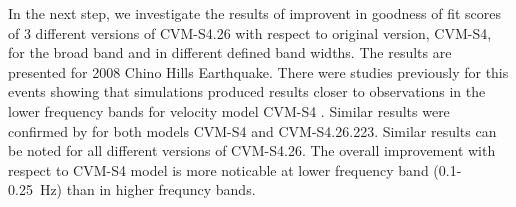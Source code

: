 

In the next step, we investigate the results of improvent in goodness of fit scores of 3 different versions of CVM-S4.26 with respect to original version, CVM-S4, for the broad band and in different defined band widths. The results are presented for 2008 Chino Hills Earthquake. There were studies previously for this events showing that simulations produced results closer to observations in the lower frequency bands for velocity model CVM-S4 \citep{Taborda_2013_BSSA}. Similar results were confirmed by \citet{Taborda_2016}for both models CVM-S4 and CVM-S4.26.223. Similar results can be noted for all different versions of CVM-S4.26. The overall improvement with respect to CVM-S4 model is more noticable at lower frequency band (0.1-0.25~Hz) than in higher frequncy bands. 

